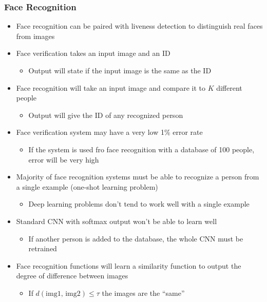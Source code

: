 \documentclass[12pt, letterpaper]{article}
\begin{document}
    \subsubsection{Face Recognition}
    \begin{itemize}
        \item Face recognition can be paired with liveness detection to distinguish real faces from images
        \item Face verification takes an input image and an ID
        \begin{itemize}
            \item Output will state if the input image is the same as the ID
        \end{itemize}
        \item Face recognition will take an input image and compare it to $K$ different people
        \begin{itemize}
            \item Output will give the ID of any recognized person
        \end{itemize}
        \item Face verification system may have a very low 1\% error rate
        \begin{itemize}
            \item If the system is used fro face recognition with a database of 100 people, error will be very high 
        \end{itemize}
        \item Majority of face recognition systems must be able to recognize a person from a single example (one-shot learning problem)
        \begin{itemize}
            \item Deep learning problems don't tend to work well with a single example   
        \end{itemize}
        \item Standard CNN with softmax output won't be able to learn well 
        \begin{itemize}
            \item If another person is added to the database, the whole CNN must be retrained
        \end{itemize}
        \item Face recognition functions will learn a similarity function to output the degree of difference between images
        \begin{itemize}
            \item If $d(\text{img1, img2})\leq \tau$ the images are the ``same''

\end{itemize}
\end{itemize}
\end{document}
